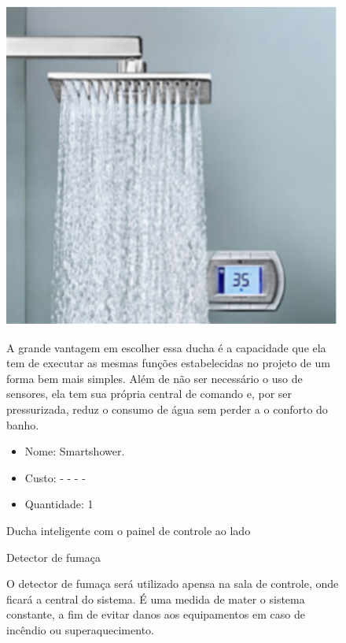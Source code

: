 \begin{enumerate}
\begin{figure}[h]
	  \begin{center}
		\includegraphics[keepaspectratio,scale=0.60]{figuras/ducha_inteligente.eps}
		\caption{Ducha inteligente com o painel de controle ao lado}
	  \end{center}
		
	A grande vantagem em escolher essa ducha é a capacidade que ela tem de executar as mesmas funções estabelecidas no projeto de um forma bem mais simples. Além de não ser necessário o uso de sensores, ela tem sua própria central de comando e, por ser pressurizada, reduz o consumo de água sem perder a o conforto do banho.

	\begin{itemize}
		\item Nome: Smartshower.
		\item Custo: - - - - 
		\item Quantidade: 1
	\end{itemize}
	\end{figure}
	
	\begin{figure}[h]
	\item Detector de fumaça
	
	O detector de fumaça será utilizado apensa na sala de controle, onde ficará a central do sistema. É uma medida de mater o sistema constante, a fim de evitar danos aos equipamentos em caso de incêndio ou superaquecimento.
	

\end{figure}
\end{enumerate}
